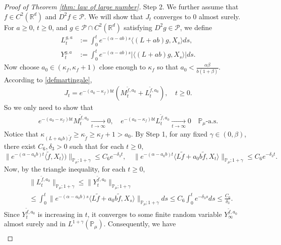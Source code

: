 \documentclass[12pt,a4paper]{amsart}
\theoremstyle{plain}
\theoremstyle{definition}
\numberwithin{equation}{section}
\begin{document}
\begin{proof}[Proof of Theorem \ref{thm: law of large number}]
Step 2.
We further assume that $f\in C^2(\mathbb R^d)$ and $D^2f \in \mathcal{P}$.
We will show that $J_t$ converges to $0$ almost surely.
For $a \geq 0$, $ t\geq 0$, and $g\in \mathcal{P}\cap C^2(\mathbb{R}^d)$ satisfying $D^2g\in \mathcal{P}$, we define
\begin{align}
	L_t^{g,a}
  & :=\int_0^t e^{-(\alpha-ab)s}\langle (L+ab)g,X_s\rangle ds,\\
  Y_t^{g,a}
  & :=\int_0^t e^{-(\alpha-ab)s}|\langle (L+ab)g,X_s\rangle|ds.
\end{align}
Now choose $a_0 \in (\kappa_{f}, \kappa_f + 1)$ close enough to $\kappa_f$ so that $a_0 < \frac{\alpha \beta}{b(1+\beta)}$.
According to \eqref{defmartingale}, 
\begin{align}
  J_t
  = e^{-(a_0-\kappa_f)bt} (M_t^{\widetilde{f}, a_0}+L_t^{\widetilde{f}, a_0}),
  \quad t\geq 0.
\end{align}
So we only need to show that
\begin{align}
  e^{-(a_0-\kappa_f)b t}M_t^{\widetilde{f},a_0}
  \xrightarrow[t\to \infty]{} 0,
  \quad e^{-(a_0-\kappa_f)b t}L_t^{\widetilde{f},a_0}
  \xrightarrow[t\to \infty]{} 0
  \quad \mathbb{P}_{\mu}\text{-a.s.}
\end{align}
Notice that $\kappa_{(L+a_0 b)\widetilde{f}}\geq \kappa_{\widetilde{f}}\geq \kappa_f+1 > a_0$.
By Step 1, for any fixed $\gamma\in (0,\beta)$, there exist $C_6, \delta_3>0$ such that for each $t\geq 0$,
\begin{equation}
  \| e^{-(\alpha-a_0 b)t}\langle \widetilde{f},X_t\rangle)\|_{\mathbb{P}_{\mu};1+\gamma}
  \leq C_6 e^{-\delta_3 t},
  \quad \|e^{-(\alpha-a_0 b)t}\langle L\widetilde{f}+a_0 b\widetilde{f},X_t\rangle\|_{\mathbb{P}_{\mu};1+\gamma}
  \leq C_6 e^{-\delta_3 t}.
\end{equation}
Now, by the triangle inequality, for each $t\geq 0$,
\begin{align}
  & \|L_t^{\widetilde{f},a_0}\|_{\mathbb{P}_{\mu};1+\gamma}
    \leq\|Y_t^{\widetilde{f},a_0}\|_{\mathbb{P}_{\mu};1+\gamma} \\
  & \leq \int_0^t \|e^{-(\alpha-a_0 b)s}\langle L\widetilde{f}+a_0 b\widetilde{f},X_s\rangle\|_{\mathbb{P}_{\mu};1+\gamma}ds\leq C_6 \int_0^t e^{-\delta_3 s}ds\leq\frac{C_6}{\delta_3}.
\end{align}
Since $Y_t^{\widetilde{f},a_0}$ is increasing in $t$, it converges to some finite random variable $Y_{\infty}^{\widetilde{f},a_0}$ almost surely and in $L^{1+\gamma}(\mathbb{P}_{\mu})$.
Consequently,  we have
\begin{align}

\end{align}
\end{proof}
\end{document}
